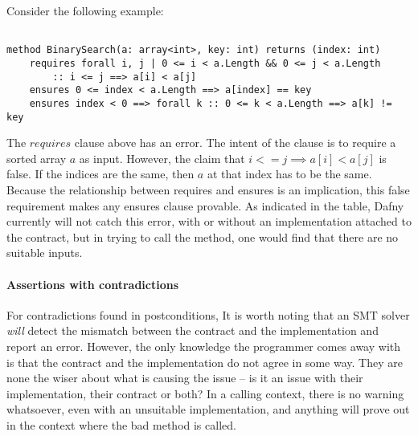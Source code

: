\documentclass{article}
\newif\ifcomments
\newcommand{\egm}[1]{\ifcomments\textcolor{orange}{egm: #1}\fi}
\newcommand{\cass}[1]{\ifcomments\textcolor{blue}{cass: #1}\fi}
\begin{document}
\egm{Create a listings environment for Dafny and add in any additional Dafny keywords. See \href{https://github.com/ericmercer/SPIN-bpmn-cwp-verification-paper.git}{my spin paper} where I define an environment for Promela. Also, create the \emph{figref}, \emph{tabref}, and \emph{secref} comments for referring to figures, tables, and sections respectively. Example of that should be the paper as well.}
\cass{Someone posted a language definition for dafny for latex online and I edited it...but I don't know why the keywords aren't getting bolded! Idk, it just looks weird, and it seems like none of the 
settings I'm trying to set are working. I also added the referring stuff}

Consider the following example:

\begin{lstlisting}[language=dafny]

method BinarySearch(a: array<int>, key: int) returns (index: int)
    requires forall i, j | 0 <= i < a.Length && 0 <= j < a.Length
        :: i <= j ==> a[i] < a[j]
    ensures 0 <= index < a.Length ==> a[index] == key
    ensures index < 0 ==> forall k :: 0 <= k < a.Length ==> a[k] != key

\end{lstlisting}

The \(requires\) clause above has an error. The intent of the clause is to require a sorted array \(a\) as input.
However, the claim that \(i <= j \implies a[i] < a[j]\) is false. If the indices are the same, then \(a\) at that
index has to be the same. Because the relationship between requires and ensures is an implication, this false requirement
makes any ensures clause provable. As indicated in the table, Dafny currently will not catch this error, with or without an implementation attached to
the contract, but in trying to call the method, one would find that there are no suitable inputs.  

\paragraph{Assertions with contradictions}

For contradictions found in postconditions, It is worth noting that 
an SMT solver {\it will} detect the mismatch between the contract and the implementation and report an error. However, 
the only knowledge the programmer comes away with is that the contract and the implementation do not agree in some way. They are none the wiser 
about what is causing the issue – is it an issue with their implementation, their contract or both? In a calling context, there is no warning 
whatsoever, even with an unsuitable implementation, and anything will prove out in the context where the bad method is called. 
\end{document}
